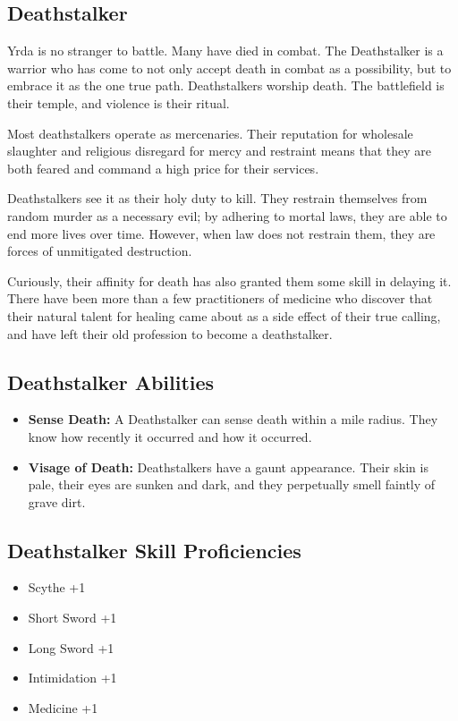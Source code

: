 \begin{multicols}{2}
\section{Deathstalker}

Yrda is no stranger to battle. Many have died in combat. The Deathstalker
is a warrior who has come to not only accept death in combat as a possibility,
but to embrace it as the one true path. Deathstalkers worship death. The
battlefield is their temple, and violence is their ritual.

Most deathstalkers operate as mercenaries. Their reputation for wholesale
slaughter and religious disregard for mercy and restraint means that they
are both feared and command a high price for their services.

Deathstalkers see it as their holy duty to kill. They restrain themselves
from random murder as a necessary evil; by adhering to mortal laws, they
are able to end more lives over time. However, when law does not restrain
them, they are forces of unmitigated destruction.

Curiously, their affinity for death has also granted them some skill in
delaying it. There have been more than a few practitioners of medicine
who discover that their natural talent for healing came about as a side
effect of their true calling, and have left their old profession to become
a deathstalker.

\subsection{Deathstalker Abilities}

\begin{itemize}
    \item \textbf{Sense Death:} A Deathstalker can sense death within a 
    mile radius. They know how recently it occurred and how it occurred.
    \item \textbf{Visage of Death:} Deathstalkers have a gaunt appearance.
    Their skin is pale, their eyes are sunken and dark, and they perpetually
    smell faintly of grave dirt.
\end{itemize}

\subsection{Deathstalker Skill Proficiencies}

\begin{itemize}
    \item Scythe +1
    \item Short Sword +1
    \item Long Sword +1
    \item Intimidation +1
    \item Medicine +1
\end{itemize}


\end{multicols}
